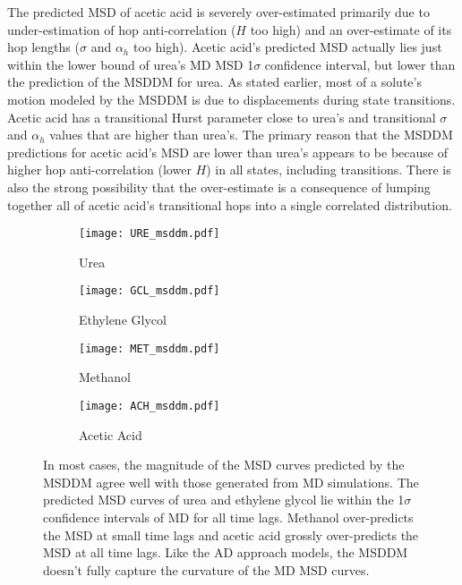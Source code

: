 \documentclass[journal=ancac3,manuscript=article,layout=twocolumn]{achemso}
\begin{document}
  The predicted MSD of acetic acid is severely over-estimated primarily due to
  under-estimation of hop anti-correlation ($H$ too high) and an over-estimate
  of its hop lengths ($\sigma$ and $\alpha_h$ too high). Acetic acid's
  predicted MSD actually lies just within the lower bound of urea's MD MSD
  1$\sigma$ confidence interval, but lower than the prediction of the MSDDM for
  urea. As stated earlier, most of a solute’s motion modeled by the MSDDM is
  due to displacements during state transitions. Acetic acid has a transitional
  Hurst parameter close to urea’s and transitional $\sigma$ and $\alpha_h$
  values that are higher than urea’s. The primary reason that the MSDDM
  predictions for acetic acid's MSD are lower than urea's appears to be because
  of higher hop anti-correlation (lower $H$) in all states, including
  transitions. There is also the strong possibility that the over-estimate is
  a consequence of lumping together all of acetic acid’s transitional hops into
  a single correlated distribution.

  \begin{figure*}
  \centering
  \begin{subfigure}{0.45\textwidth}
  \texttt{[image: URE\_msddm.pdf]}
  \caption{Urea}\label{fig:URE_msddm}
  \end{subfigure}
  \begin{subfigure}{0.45\textwidth}
  \texttt{[image: GCL\_msddm.pdf]}
  \caption{Ethylene Glycol}\label{fig:GCL_msddm}
  \end{subfigure}
  \begin{subfigure}{0.45\textwidth}
  \texttt{[image: MET\_msddm.pdf]}
  \caption{Methanol}\label{fig:MET_msddm}
  \end{subfigure}
  \begin{subfigure}{0.45\textwidth}
  \texttt{[image: ACH\_msddm.pdf]}
  \caption{Acetic Acid}\label{fig:ACH_msddm}
  \end{subfigure}
  \caption{In most cases, the magnitude of the MSD curves predicted by the
	  MSDDM agree well with those generated from MD simulations. The
	  predicted MSD curves of urea and ethylene glycol lie within the
	  1$\sigma$ confidence intervals of MD for all time lags. Methanol
	  over-predicts the MSD at small time lags and acetic acid grossly
	  over-predicts the MSD at all time lags.  Like the AD approach models,
	  the MSDDM doesn't fully capture the curvature of the MD MSD curves.
	  }\label{fig:msddm_performance}
  \end{figure*}
  
\end{document}
